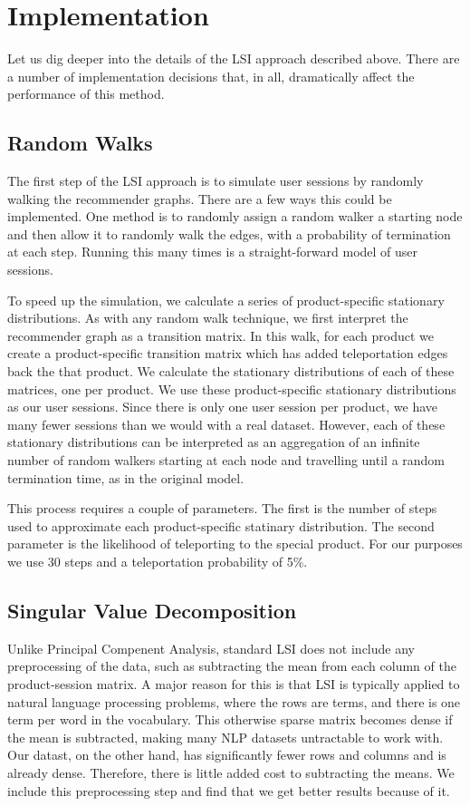 \documentclass[11pt]{article}
\begin{document}
\section*{Implementation}
Let us dig deeper into the details of the LSI approach described above. There 
are a number of implementation decisions that, in all, dramatically affect the
performance of this method.

\subsection*{Random Walks}
The first step of the LSI approach is to simulate user sessions by randomly
walking the recommender graphs. There are a few ways this could be implemented.
One method is to randomly assign a random walker a starting node and then allow
it to randomly walk the edges, with a probability of termination at each step.
Running this many times is a straight-forward model of user sessions.

To speed up the simulation, we calculate a series of product-specific stationary
distributions. As with any random walk technique, we first interpret the 
recommender graph as a transition matrix. In this walk, for each product we create a
product-specific transition matrix which has added teleportation edges back the
that product. We calculate the stationary distributions of each of these
matrices, one per product. We use these product-specific stationary
distributions as our user sessions. Since there is only one user session per 
product, we have many fewer sessions than we would with a real dataset. However,
each of these stationary distributions can be interpreted as an aggregation of
an infinite number of random walkers starting at each node and travelling until
a random termination time, as in the original model.

This process requires a couple of parameters. The first is the number of steps used to
approximate each product-specific statinary distribution. The second parameter
is the likelihood of teleporting to the special product. For our purposes we use
30 steps and a teleportation probability of 5\%.

\subsection*{Singular Value Decomposition}
Unlike Principal Compenent Analysis, standard LSI does not include any
preprocessing of the data, such as subtracting the mean from each column of the
product-session matrix. A major reason for this is that LSI is typically applied
to natural language processing problems, where the rows are terms, and there is
one term per word in the vocabulary. This otherwise sparse matrix becomes dense
if the mean is subtracted, making many NLP datasets untractable to work with. 
Our datast, on the other hand, has significantly fewer rows and columns and is
already dense. Therefore, there is little added cost to subtracting the
means. We include this preprocessing step and find that we get better results
because of it.
\end{document}
